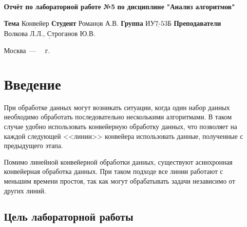\documentclass[12pt]{report}
\begin{document}
\begin{titlepage}
	
	\begin{center}
		\noindent\begin{minipage}{1.3\textwidth}\centering
			\Large\textbf{  Отчёт по лабораторной работе №5}\newline
			\textbf{по дисциплине "Анализ алгоритмов"}\newline\newline
		\end{minipage}
	\end{center}
	
	\noindent\textbf{Тема} $\underline{\text{Конвейер}}$\newline\newline
	\noindent\textbf{Студент} $\underline{\text{Романов А.В.}}$\newline\newline
	\noindent\textbf{Группа} $\underline{\text{ИУ7-53Б}}$\newline\newline
	\noindent\textbf{Преподаватели} $\underline{\text{Волкова Л.Л., Строганов Ю.В.}}$\newline\newline\newline
	
	\begin{center}
		\vfill
		Москва~---~\the\year
		~г.
	\end{center}
\end{titlepage}


\tableofcontents

\newpage
\chapter*{Введение}

При обработке данных могут возникать ситуации, когда один набор данных необходимо обработать последовательно несколькими алгоритмами. В таком случае удобно использовать конвейерную обработку данных, что позволяет на каждой следующей <<линии>> конвейера использовать данные, полученные с предыдущего этапа. 

Помимо линейной конвейерной обработки данных, существуют асинхронная конвейерная обработка данных. При таком подходе все линии работают с меньшим времени простоя, так как могут обрабатывать задачи независимо от других линий.

\section*{Цель лабораторной работы}
\end{document}
